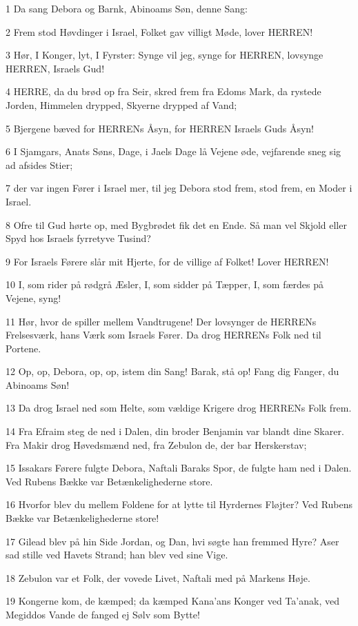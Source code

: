 \par 1 Da sang Debora og Barnk, Abinoams Søn, denne Sang:
\par 2 Frem stod Høvdinger i Israel, Folket gav villigt Møde, lover HERREN!
\par 3 Hør, I Konger, lyt, I Fyrster: Synge vil jeg, synge for HERREN, lovsynge HERREN, Israels Gud!
\par 4 HERRE, da du brød op fra Seir, skred frem fra Edoms Mark, da rystede Jorden, Himmelen drypped, Skyerne drypped af Vand;
\par 5 Bjergene bæved for HERRENs Åsyn, for HERREN Israels Guds Åsyn!
\par 6 I Sjamgars, Anats Søns, Dage, i Jaels Dage lå Vejene øde, vejfarende sneg sig ad afsides Stier;
\par 7 der var ingen Fører i Israel mer, til jeg Debora stod frem, stod frem, en Moder i Israel.
\par 8 Ofre til Gud hørte op, med Bygbrødet fik det en Ende. Så man vel Skjold eller Spyd hos Israels fyrretyve Tusind?
\par 9 For Israels Førere slår mit Hjerte, for de villige af Folket! Lover HERREN!
\par 10 I, som rider på rødgrå Æsler, I, som sidder på Tæpper, I, som færdes på Vejene, syng!
\par 11 Hør, hvor de spiller mellem Vandtrugene! Der lovsynger de HERRENs Frelsesværk, hans Værk som Israels Fører. Da drog HERRENs Folk ned til Portene.
\par 12 Op, op, Debora, op, op, istem din Sang! Barak, stå op! Fang dig Fanger, du Abinoams Søn!
\par 13 Da drog Israel ned som Helte, som vældige Krigere drog HERRENs Folk frem.
\par 14 Fra Efraim steg de ned i Dalen, din broder Benjamin var blandt dine Skarer. Fra Makir drog Høvedsmænd ned, fra Zebulon de, der bar Herskerstav;
\par 15 Issakars Førere fulgte Debora, Naftali Baraks Spor, de fulgte ham ned i Dalen. Ved Rubens Bække var Betænkelighederne store.
\par 16 Hvorfor blev du mellem Foldene for at lytte til Hyrdernes Fløjter? Ved Rubens Bække var Betænkelighederne store!
\par 17 Gilead blev på hin Side Jordan, og Dan, hvi søgte han fremmed Hyre? Aser sad stille ved Havets Strand; han blev ved sine Vige.
\par 18 Zebulon var et Folk, der vovede Livet, Naftali med på Markens Høje.
\par 19 Kongerne kom, de kæmped; da kæmped Kana'ans Konger ved Ta'anak, ved Megiddos Vande de fanged ej Sølv som Bytte!
